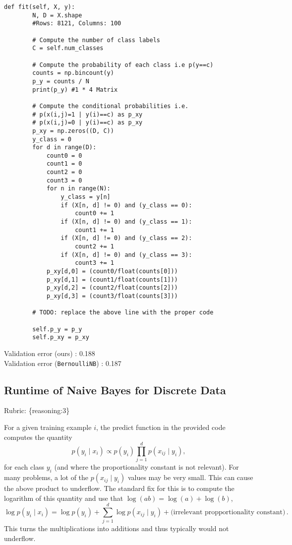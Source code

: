 \documentclass{article}
\def\rubric#1{\gre{Rubric: \{#1\}}}{}
\def\gre#1{{\color{gre}#1}}
\def\red#1{{\color{red}#1}}
\def\cond{\; | \;}
\begin{document}
\begin{lstlisting}
def fit(self, X, y):
        N, D = X.shape
        #Rows: 8121, Columns: 100

        # Compute the number of class labels
        C = self.num_classes

        # Compute the probability of each class i.e p(y==c)
        counts = np.bincount(y)
        p_y = counts / N
        print(p_y) #1 * 4 Matrix

        # Compute the conditional probabilities i.e.
        # p(x(i,j)=1 | y(i)==c) as p_xy
        # p(x(i,j)=0 | y(i)==c) as p_xy
        p_xy = np.zeros((D, C))
        y_class = 0
        for d in range(D):
            count0 = 0
            count1 = 0
            count2 = 0
            count3 = 0
            for n in range(N):
                y_class = y[n]
                if (X[n, d] != 0) and (y_class == 0):
                    count0 += 1
                if (X[n, d] != 0) and (y_class == 1):
                    count1 += 1
                if (X[n, d] != 0) and (y_class == 2):
                    count2 += 1
                if (X[n, d] != 0) and (y_class == 3):
                    count3 += 1
            p_xy[d,0] = (count0/float(counts[0]))
            p_xy[d,1] = (count1/float(counts[1]))
            p_xy[d,2] = (count2/float(counts[2]))
            p_xy[d,3] = (count3/float(counts[3]))
        
        # TODO: replace the above line with the proper code 

        self.p_y = p_y
        self.p_xy = p_xy
\end{lstlisting}

\red{Validation error (ours) : 0.188 \\
    Validation error (\texttt{BernoulliNB}) : 0.187}

\subsection{Runtime of Naive Bayes for Discrete Data}
\rubric{reasoning:3}

For a given training example $i$, the predict function in the provided code computes the quantity
\[
p(y_i \cond x_i) \propto p(y_i)\prod_{j=1}^d p(x_{ij} \cond y_i),
\]
for each class $y_i$ (and where the proportionality constant is not relevant). For many problems, a lot of the $p(x_{ij} \cond y_i)$ values may be very small. This can cause the above product to underflow. The standard fix for this is to compute the logarithm of this quantity and use that $\log(ab) = \log(a)+\log(b)$,
\[
\log p(y_i \cond x_i) = \log p(y_i) + \sum_{j=1}^d \log p(x_{ij} \cond y_i) + \text{(irrelevant propportionality constant)} \, .
\]
This turns the multiplications into additions and thus typically would not underflow.
\end{document}
